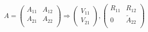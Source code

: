 \documentclass[runningheads]{llncs}
\begin{document}
\begin{equation}
  \label{eq:lap_qr0}
  A=\left(\begin{array}{cc}
    A_{11} & A_{12}  \\
    A_{21} & A_{22}  \\
  \end{array}\right) \Longrightarrow
  \left(\begin{array}{c}
      V_{11} \\
      V_{21}
\end{array}\right), \left(\begin{array}{cc}

    R_{11}   & R_{12}        \\
      0     &\tilde{A}_{22} \\
  \end{array}\right)
\end{equation}
\end{document}
